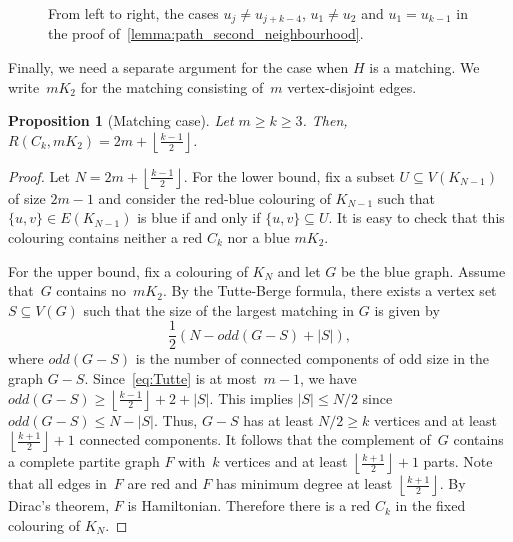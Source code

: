 \documentclass{article}
\newtheorem{proposition}[theorem]{Proposition}
\newcommand*{\floorfrac}[2]{\mathopen{}\left\lfloor\frac{#1}{#2}\right\rfloor\mathclose{}}
\begin{document}
\begin{figure}[h!]
\begin{subfigure}{.32\textwidth}
        \caption{}
        \label{fig1:c}
        \end{subfigure} 
        \vspace*{-0.25cm}
        \caption{From left to right, the cases $u_j\neq u_{j+k-4}$, $u_1\neq u_2$ and $u_1=u_{k-1}$ in the proof of~\cref{lemma:path_second_neighbourhood}.}
        \label{fig1}
    \end{figure}

Finally, we need a separate argument for the case when $H$ is a matching.
We write~$mK_2$ for the matching consisting of~$m$ vertex-disjoint edges.

\begin{proposition}[Matching case]\label{proposition:matching}
    Let $m \ge k \geq 3$. 
    Then, $R(C_k,mK_2) = 2m + \floorfrac{k-1}{2} $.
\end{proposition}
\begin{proof}
    Let $N = 2m +\floorfrac{k-1}{2}$.
    For the lower bound, fix a subset $U \subseteq V(K_{N-1})$ of size $2m-1$ and consider the red-blue colouring of $K_{N-1}$ such that $\{u, v\} \in E(K_{N-1})$ is blue if and only if $\{u, v\} \subseteq U$.
    It is easy to check that this colouring contains neither a red $C_k$ nor a blue $mK_2$.

    For the upper bound, fix a colouring of $K_N$ and let $G$ be the blue graph.
    Assume that~$G$ contains no~$mK_2$.
    By the Tutte-Berge formula, there exists a vertex set $S\subseteq V(G)$ such that the size of the largest matching in $G$ is given by 
    \begin{equation}\label{eq:Tutte}
        \frac{1}{2}\left( N - odd(G - S) + |S| \right),    
    \end{equation} 
    where $odd(G-S)$ is the number of connected components of odd size in the graph $G - S$.
    Since~\eqref{eq:Tutte} is at most~$m-1$, we have $odd(G-S)\ge\floorfrac{k-1}{2} + 2+|S|$.
    This implies $|S|\le N/2$ since $odd(G-S)\le N-|S|$.
    Thus, $G-S$ has at least $N/2\ge k$ vertices and at least $\floorfrac{k+1}{2} + 1$ connected components.
    It follows that the complement of~$G$ contains a complete partite graph $F$ with~$k$ vertices and at least $\floorfrac{k+1}{2} + 1$ parts.
    Note that all edges in~$F$ are red and $F$ has minimum degree at least $\floorfrac{k+1}{2}$.
    By Dirac's theorem, $F$ is Hamiltonian.
    Therefore there is a red $C_k$ in the fixed colouring of $K_N$. 
\end{proof}
\end{document}
